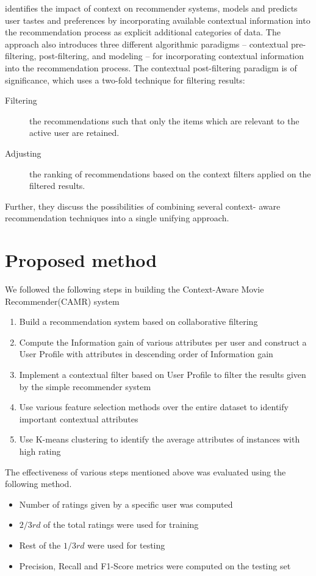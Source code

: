 \documentclass{article}
\begin{document}
\cite{adomavicius2011context} identifies the impact of context on recommender systems, models and predicts user tastes and preferences by incorporating available contextual information into the recommendation process as explicit additional categories of data. The approach also introduces three different algorithmic paradigms – contextual pre-
filtering, post-filtering, and modeling – for incorporating contextual information into the recommendation process. The contextual post-filtering paradigm is of significance, which uses a two-fold technique for filtering results:
\begin{description}
\item[Filtering] the recommendations such that only the items which are relevant to the active user are retained.
\item[Adjusting] the ranking of recommendations based on the context filters applied on the filtered results.
\end{description}
Further, they discuss the possibilities of combining several context- aware recommendation techniques into a single unifying approach.

\section{Proposed method}

We followed the following steps in building the Context-Aware Movie Recommender(CAMR) system

\begin{enumerate}
\item Build a recommendation system based on collaborative filtering
\item Compute the Information gain of various attributes per user and construct a User Profile with attributes in descending order of Information gain 
\item Implement a contextual filter based on User Profile to filter the results given by the simple recommender system
\item Use various feature selection methods over the entire dataset to identify important contextual attributes
\item Use K-means clustering to identify the average attributes of instances with high rating
\end{enumerate}


The effectiveness of various steps mentioned above was evaluated using the following method.

\begin{itemize}
\item Number of ratings given by a specific user was computed 
\item $2/3rd$ of the total ratings were used for training
\item Rest of the $1/3rd$ were used for testing
\item Precision, Recall and F1-Score metrics were computed on the testing set 
\end{itemize}
\end{document}
